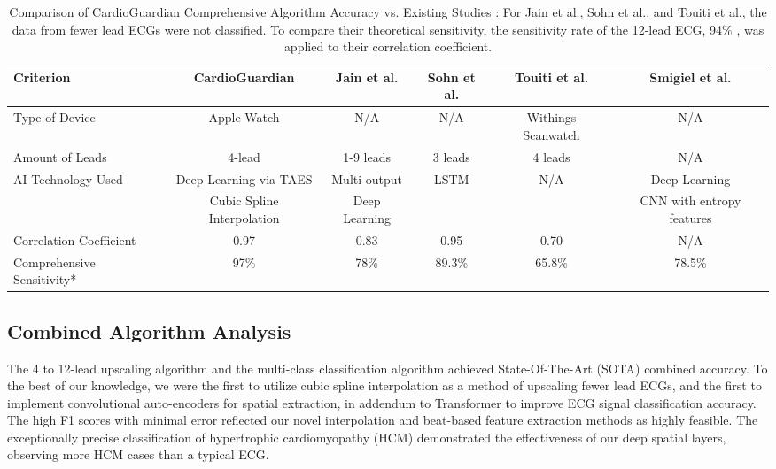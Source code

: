 \documentclass[
	a4paper, 
	10pt, 
	twoside, 
]{LTJournalArticle}
\begin{document}
\begin{table*}
  \caption{Comparison of CardioGuardian Comprehensive Algorithm Accuracy vs. Existing Studies \newline *: For Jain et al., Sohn et al., and Touiti et al., the data from fewer lead ECGs were not classified. To compare their theoretical sensitivity, the sensitivity rate of the 12-lead ECG, 94\% \cite{Harmon2015}, was applied to their correlation coefficient.}
  \centering
  \resizebox{\textwidth}{!}
  {
  \begin{tabular}{lccccc}
    \toprule
    \textbf{Criterion} & \textbf{CardioGuardian} & \textbf{Jain et al.} & \textbf{Sohn et al.} & \textbf{Touiti et al.} & \textbf{Smigiel et al.}\\ 
    \midrule
    Type of Device & Apple Watch  & N/A & N/A & Withings Scanwatch & N/A\\
    \midrule
    Amount of Leads & 4-lead  & 1-9 leads & 3 leads &  4 leads & N/A\\
    \midrule
    AI Technology Used & Deep Learning via TAES  & Multi-output & LSTM &  N/A & Deep Learning \\
                       & Cubic Spline Interpolation  & Deep Learning &  & & CNN with entropy features \\
    \midrule
    Correlation Coefficient  & 0.97  & 0.83 & 0.95 & 0.70 & N/A\\
    \midrule
    Comprehensive Sensitivity*  & 97\%  & 78\% & 89.3\% & 65.8\% & 78.5\%\\

    \bottomrule
  \end{tabular}
  }
  \label{tab:CG_comp}
  
\end{table*}
\subsection{Combined Algorithm Analysis}

The 4 to 12-lead upscaling algorithm and the multi-class classification algorithm achieved State-Of-The-Art (SOTA) combined accuracy. To the best of our knowledge, we were the first to utilize cubic spline interpolation as a method of upscaling fewer lead ECGs, and the first to implement convolutional auto-encoders for spatial extraction, in addendum to Transformer to improve ECG signal classification accuracy. The high F1 scores with minimal error reflected our novel interpolation and beat-based feature extraction methods as highly feasible. The exceptionally precise classification of hypertrophic cardiomyopathy (HCM) demonstrated the effectiveness of our deep spatial layers, observing more HCM cases than a typical ECG. 
\end{document}
